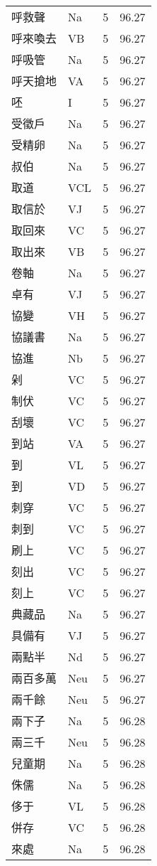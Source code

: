 \documentclass[twocolumn]{book}
\begin{document}
\begin{supertabular}{llrr}
呼救聲 & Na & 5 &  96.27\\
呼來喚去 & VB & 5 &  96.27\\
呼吸管 & Na & 5 &  96.27\\
呼天搶地 & VA & 5 &  96.27\\
呸 & I & 5 &  96.27\\
受徵戶 & Na & 5 &  96.27\\
受精卵 & Na & 5 &  96.27\\
叔伯 & Na & 5 &  96.27\\
取道 & VCL & 5 &  96.27\\
取信於 & VJ & 5 &  96.27\\
取回來 & VC & 5 &  96.27\\
取出來 & VB & 5 &  96.27\\
卷軸 & Na & 5 &  96.27\\
卓有 & VJ & 5 &  96.27\\
協變 & VH & 5 &  96.27\\
協議書 & Na & 5 &  96.27\\
協進 & Nb & 5 &  96.27\\
剁 & VC & 5 &  96.27\\
制伏 & VC & 5 &  96.27\\
刮壞 & VC & 5 &  96.27\\
到站 & VA & 5 &  96.27\\
到 & VL & 5 &  96.27\\
到 & VD & 5 &  96.27\\
刺穿 & VC & 5 &  96.27\\
刺到 & VC & 5 &  96.27\\
刷上 & VC & 5 &  96.27\\
刻出 & VC & 5 &  96.27\\
刻上 & VC & 5 &  96.27\\
典藏品 & Na & 5 &  96.27\\
具備有 & VJ & 5 &  96.27\\
兩點半 & Nd & 5 &  96.27\\
兩百多萬 & Neu & 5 &  96.27\\
兩千餘 & Neu & 5 &  96.27\\
兩下子 & Na & 5 &  96.28\\
兩三千 & Neu & 5 &  96.28\\
兒童期 & Na & 5 &  96.28\\
侏儒 & Na & 5 &  96.28\\
侈于 & VL & 5 &  96.28\\
併存 & VC & 5 &  96.28\\
來處 & Na & 5 &  96.28\\

\end{supertabular}
\end{document}
